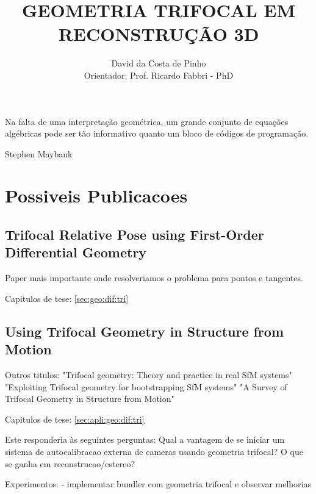 \documentclass[12pt,a4paper]{article}
\author{David da Costa de Pinho\\Orientador: Prof. Ricardo Fabbri - PhD}
\title{GEOMETRIA TRIFOCAL EM RECONSTRUÇÃO 3D}
\begin{document}
\maketitle
\newpage
\epigraph{Na falta de uma interpretação geométrica, um grande conjunto de equações algébricas pode ser tão informativo quanto um bloco de códigos de programação.}{Stephen Maybank}
\newpage
\tableofcontents
\newpage
\listoffigures



%






\nocite{Fabbri:Kimia:CVPR10,Hartley2004,Faugeras,Schmid00,2503343,HartleyLi,koser,kukelova,pajdla,byrod}


\appendix



\section{Possiveis Publicacoes}
\subsection{Trifocal Relative Pose using First-Order Differential Geometry}
Paper mais importante onde resolveriamos o problema para pontos e tangentes.

Capitulos de tese: \ref{sec:geo:dif:tri}

\subsection{Using Trifocal Geometry in Structure from Motion}
Outros titulos:
"Trifocal geometry: Theory and practice in real SfM systems"
"Exploiting Trifocal geometry for bootstrapping SfM systems"
"A Survey of Trifocal Geometry in Structure from Motion"

Capitulos de tese: \ref{sec:apli:geo:dif:tri}

Este responderia às seguintes perguntas:
Qual a vantagem de se iniciar um sistema de autocalibracao externa de cameras usando
geometria trifocal?  O que se ganha em reconstrucao/estereo?

Experimentos:
- implementar bundler com geometria trifocal e observar melhorias
	
 

\end{document}
